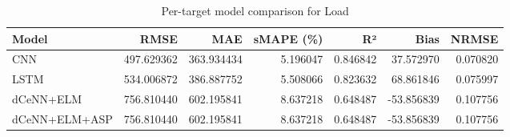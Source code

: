 \begin{table}
\caption{Per-target model comparison for Load}
\begin{tabular}{lrrrrrr}
\toprule
Model & RMSE & MAE & sMAPE (\%) & R² & Bias & NRMSE \\
\midrule
CNN & 497.629362 & 363.934434 & 5.196047 & 0.846842 & 37.572970 & 0.070820 \\
LSTM & 534.006872 & 386.887752 & 5.508066 & 0.823632 & 68.861846 & 0.075997 \\
dCeNN+ELM & 756.810440 & 602.195841 & 8.637218 & 0.648487 & -53.856839 & 0.107756 \\
dCeNN+ELM+ASP & 756.810440 & 602.195841 & 8.637218 & 0.648487 & -53.856839 & 0.107756 \\
\bottomrule
\end{tabular}
\end{table}
